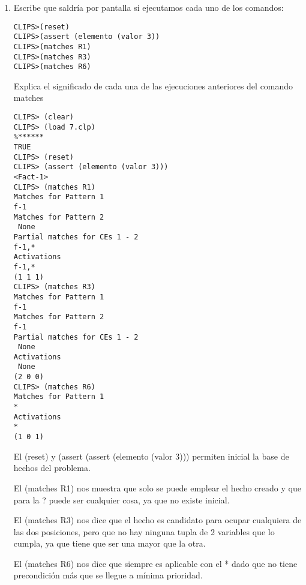 \documentclass[12pt, spanish, pdftex]{UC3M_document}
\begin{document}
\begin{enumerate}
\begin{enumerate}
		      \item Escribe que saldría por pantalla si ejecutamos cada uno de los comandos:
		            \begin{lstlisting}
CLIPS>(reset)
CLIPS>(assert (elemento (valor 3))
CLIPS>(matches R1)
CLIPS>(matches R3)
CLIPS>(matches R6)
\end{lstlisting}
		            Explica el significado de cada una de las ejecuciones anteriores del comando matches
		            \begin{lstlisting}
CLIPS> (clear)
CLIPS> (load 7.clp)
%******
TRUE
CLIPS> (reset)
CLIPS> (assert (elemento (valor 3)))
<Fact-1>
CLIPS> (matches R1)
Matches for Pattern 1
f-1
Matches for Pattern 2
 None
Partial matches for CEs 1 - 2
f-1,*
Activations
f-1,*
(1 1 1)
CLIPS> (matches R3)
Matches for Pattern 1
f-1
Matches for Pattern 2
f-1
Partial matches for CEs 1 - 2
 None
Activations
 None
(2 0 0)
CLIPS> (matches R6)
Matches for Pattern 1
*
Activations
*
(1 0 1)
\end{lstlisting}
		            El (reset) y (assert (assert (elemento (valor 3))) permiten inicial la base de hechos del problema.

		            El (matches R1) nos muestra que solo se puede emplear el hecho creado y que para la ? puede ser cualquier cosa, ya que no existe inicial.

		            El (matches R3) nos dice que el hecho es candidato para ocupar cualquiera de las dos posiciones, pero que no hay ninguna tupla de 2 variables que lo cumpla, ya que tiene que ser una mayor que la otra.

		            El (matches R6) nos dice que siempre es aplicable con el * dado que no tiene precondición más que se llegue a mínima prioridad.

	      \end{enumerate}

\end{enumerate}
\end{document}
